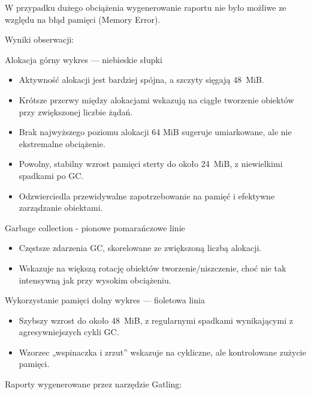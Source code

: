 \documentclass[runningheads,12pt]{llncs}
\begin{document}
W przypadku dużego obciążenia wygenerowanie raportu nie było możliwe ze względu na błąd pamięci (Memory Error).

Wyniki obserwacji:

Alokacja górny wykres — niebieskie słupki

\begin{itemize}
  \item Aktywność alokacji jest bardziej spójna, a szczyty sięgają 48~MiB.
  \item Krótsze przerwy między alokacjami wskazują na ciągłe tworzenie obiektów przy zwiększonej liczbie żądań.
  \item Brak najwyższego poziomu alokacji 64 MiB sugeruje umiarkowane, ale nie ekstremalne obciążenie.
\end{itemize}

\begin{itemize}
  \item Powolny, stabilny wzrost pamięci sterty do około 24~MiB, z niewielkimi spadkami po GC.
  \item Odzwierciedla przewidywalne zapotrzebowanie na pamięć i efektywne zarządzanie obiektami.
\end{itemize}

Garbage collection - pionowe pomarańczowe linie

\begin{itemize}
  \item Częstsze zdarzenia GC, skorelowane ze zwiększoną liczbą alokacji.
  \item Wskazuje na większą rotację obiektów tworzenie/niszczenie, choć nie tak intensywną jak przy wysokim obciążeniu.
\end{itemize}

Wykorzystanie pamięci dolny wykres — fioletowa linia

\begin{itemize}
  \item Szybszy wzrost do około 48~MiB, z regularnymi spadkami wynikającymi z agresywniejszych cykli GC.
  \item Wzorzec „wspinaczka i zrzut” wskazuje na cykliczne, ale kontrolowane zużycie pamięci.
\end{itemize}

\newpage

Raporty wygenerowane przez narzędzie Gatling:

\end{document}
